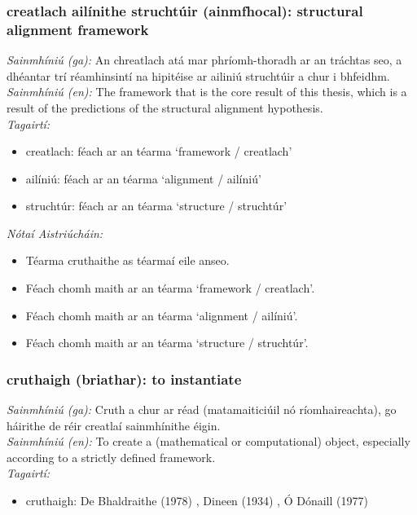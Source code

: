 \subsubsection*{creatlach ailínithe struchtúir (ainmfhocal): structural alignment framework}
 \noindent \textit{Sainmhíniú (ga):} An chreatlach atá mar phríomh-thoradh ar an tráchtas seo, a dhéantar trí réamhinsintí na hipitéise ar ailiniú struchtúir a chur i bhfeidhm.
\\
 \noindent \textit{Sainmhíniú (en):} The framework that is the core result of this thesis, which is a result of the predictions of the structural alignment hypothesis.
\\
 \noindent \textit{Tagairtí:}
\begin{itemize}
	\item creatlach: féach ar an téarma `framework / creatlach'
	\item ailíniú: féach ar an téarma `alignment / ailíniú'
	\item struchtúr: féach ar an téarma `structure / struchtúr'
\end{itemize}

 \noindent \textit{Nótaí Aistriúcháin:}
\begin{itemize}
	\item Téarma cruthaithe as téarmaí eile anseo.
	\item Féach chomh maith ar an téarma `framework / creatlach'.
	\item Féach chomh maith ar an téarma `alignment / ailíniú'.
	\item Féach chomh maith ar an téarma `structure / struchtúr'.
\end{itemize}


\subsubsection*{cruthaigh (briathar): to instantiate}
 \noindent \textit{Sainmhíniú (ga):} Cruth a chur ar réad (matamaiticiúil nó ríomhaireachta), go háirithe de réir creatlaí sainmhínithe éigin.
\\
 \noindent \textit{Sainmhíniú (en):} To create a (mathematical or computational) object, especially according to a strictly defined framework.
\\
 \noindent \textit{Tagairtí:}
\begin{itemize}
	\item cruthaigh: De Bhaldraithe (1978) \cite{de-bhaldraithe}, Dineen (1934) \cite{dineen}, Ó Dónaill (1977) \cite{odonaill}
\end{itemize}

